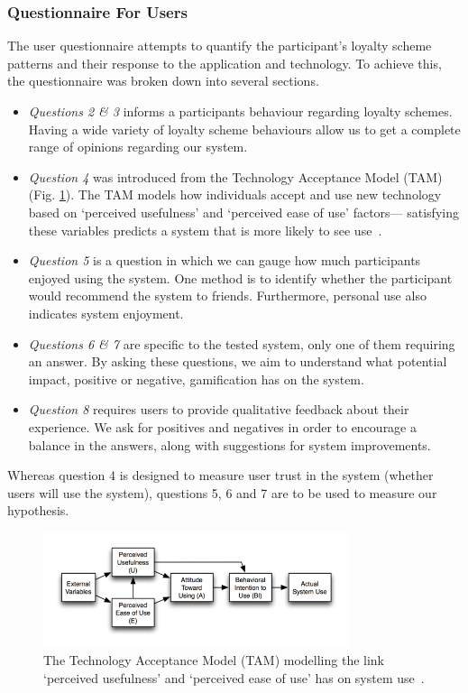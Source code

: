 \subsubsection{Questionnaire For Users}
The user questionnaire attempts to quantify the participant's loyalty scheme patterns and their response to the application and technology. To achieve this, the questionnaire was broken down into several sections.
\begin{itemize}
	\item \emph{Questions 2 \& 3} informs a participants behaviour regarding loyalty schemes. Having a wide variety of loyalty scheme behaviours allow us to get a complete range of opinions regarding our system.
	\item \emph{Question 4} was introduced from the Technology Acceptance Model (TAM)~\cite{tam} (Fig. \ref{fig:TAM}). The TAM models how individuals accept and use new technology based on `perceived usefulness' and `perceived ease of use' factors--- satisfying these variables predicts a system that is more likely to see use~\cite{tam}.
	\item \emph{Question 5} is a question in which we can gauge how much participants enjoyed using the system. One method is to identify whether the participant would recommend the system to friends. Furthermore, personal use also indicates system enjoyment.
	\item \emph{Questions 6 \& 7} are specific to the tested system, only one of them requiring an answer. By asking these questions, we aim to understand what potential impact, positive or negative, gamification has on the system.
	\item \emph{Question 8} requires users to provide qualitative feedback about their experience. We ask for positives and negatives in order to encourage a balance in the answers, along with suggestions for system improvements.
\end{itemize}

Whereas question 4 is designed to measure user trust in the system (whether users will use the system), questions 5, 6 and 7 are to be used to measure our hypothesis.

\begin{figure}[H]
 \centering
  \includegraphics[width=0.80\textwidth]{img/TAM.png}
     \caption{The Technology Acceptance Model (TAM) modelling the link `perceived usefulness' and `perceived ease of use' has on system use~\cite{tam}.}
     \label{fig:TAM}
\end{figure}

